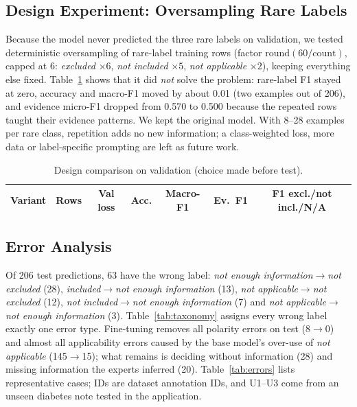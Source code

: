 \documentclass[conference]{IEEEtran}
\begin{document}
\subsection{Design Experiment: Oversampling Rare Labels}
Because the model never predicted the three rare labels on validation, we tested deterministic oversampling of rare-label training rows (factor $\mathrm{round}(60/\text{count})$, capped at 6: \emph{excluded} $\times6$, \emph{not included} $\times5$, \emph{not applicable} $\times2$), keeping everything else fixed. Table~\ref{tab:design} shows that it did \emph{not} solve the problem: rare-label F1 stayed at zero, accuracy and macro-F1 moved by about 0.01 (two examples out of 206), and evidence micro-F1 dropped from 0.570 to 0.500 because the repeated rows taught their evidence patterns. We kept the original model. With 8--28 examples per rare class, repetition adds no new information; a class-weighted loss, more data or label-specific prompting are left as future work.

\begin{table}[t]
\centering
\caption{Design comparison on validation (choice made before test).}
\label{tab:design}
\setlength{\tabcolsep}{2.5pt}
\footnotesize
\begin{tabular}{lcccccc}
\toprule
Variant & Rows & Val loss & Acc. & Macro-F1 & Ev.\ F1 & F1 excl./not incl./N/A \\
\midrule

\bottomrule
\end{tabular}
\end{table}

\subsection{Error Analysis}
Of 206 test predictions, 63 have the wrong label: \emph{not enough information}$\rightarrow$\emph{not excluded} (28), \emph{included}$\rightarrow$\emph{not enough information} (13), \emph{not applicable}$\rightarrow$\emph{not excluded} (12), \emph{not included}$\rightarrow$\emph{not enough information} (7) and \emph{not applicable}$\rightarrow$\emph{not enough information} (3). Table~\ref{tab:taxonomy} assigns every wrong label exactly one error type. Fine-tuning removes all polarity errors on test (8$\rightarrow$0) and almost all applicability errors caused by the base model's over-use of \emph{not applicable} (145$\rightarrow$15); what remains is deciding without information (28) and missing information the experts inferred (20). Table~\ref{tab:errors} lists representative cases; IDs are dataset annotation IDs, and U1--U3 come from an unseen diabetes note tested in the application.
\end{document}
